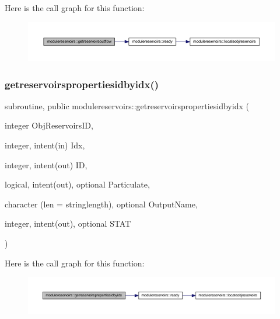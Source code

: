 Here is the call graph for this function\+:\nopagebreak
\begin{figure}[H]
\begin{center}
\leavevmode
\includegraphics[width=350pt]{namespacemodulereservoirs_a92177000a842b34a96a2edc6b49e3128_cgraph}
\end{center}
\end{figure}
\mbox{\label{namespacemodulereservoirs_ac84a64521bf81b419760543bd55c1439}} 
\subsubsection{\texorpdfstring{getreservoirspropertiesidbyidx()}{getreservoirspropertiesidbyidx()}}
{\footnotesize\ttfamily subroutine, public modulereservoirs\+::getreservoirspropertiesidbyidx (\begin{DoxyParamCaption}\item[{integer}]{Obj\+Reservoirs\+ID,  }\item[{integer, intent(in)}]{Idx,  }\item[{integer, intent(out)}]{ID,  }\item[{logical, intent(out), optional}]{Particulate,  }\item[{character (len = stringlength), optional}]{Output\+Name,  }\item[{integer, intent(out), optional}]{S\+T\+AT }\end{DoxyParamCaption})}

Here is the call graph for this function\+:\nopagebreak
\begin{figure}[H]
\begin{center}
\leavevmode
\includegraphics[width=350pt]{namespacemodulereservoirs_ac84a64521bf81b419760543bd55c1439_cgraph}
\end{center}
\end{figure}
\mbox{\label{namespacemodulereservoirs_afabb38607932bfaede946ccbce22734d}} 
